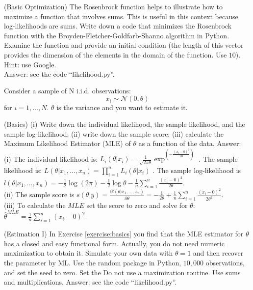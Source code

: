 \begin{exercise} (Basic Optimization)
\noindent The Rosenbrock function helps to illustrate how to maximize a function that involves sums. This is useful in this context because log-likelihoods are sums. Write down a code that minimizes the  Rosenbrock function with the Broyden-Fletcher-Goldfarb-Shanno algorithm in Python. Examine the function and provide an initial condition (the length of this vector provides the dimension of the elements in the domain of the function. Use $10$). Hint: use Google.\\
\noindent Answer: see the code ``likelihood.py''.
\end{exercise}

\noindent Consider a sample of N i.i.d. observations:
\begin{equation}
x_{i} \sim \mathcal{N}(0,\theta)
\end{equation}
\noindent for $i = 1, \ldots, N$. $\theta$ is the variance and you want to estimate it. 

\begin{exercise} (Basics) \label{exercise:basics}
(i) Write down the individual likelihood, the sample likelihood, and the sample log-likelihood; (ii) write down the sample score; (iii) calculate the Maximum Likelihood Estimator (MLE) of $\theta$ as a function of the data.
\noindent Answer:\\
\noindent (i) The individual likelihood is: $L_{i}(\theta|x_{i}) = \frac{1}{\sqrt{2\pi\theta}} \exp^{\left( -\frac{ \left( x_{i} - 0 \right)^{2}}{2 \theta} \right)}$ . The sample likelihood is: $L(\theta | x_{1}, \ldots, x_{n}) = \prod \limits _{i=1} ^{n} L_{i}(\theta|x_{i}) $ . The sample log-likelihood is $l(\theta | x_{1}, \ldots, x_{n}) = - \frac{1}{2} \log (2 \pi) - \frac{1}{2} \log \theta - \frac{1}{n} \sum \limits _{i=1} ^{n} \frac{ \left( x_{i} - 0 \right)^{2}}{2 \theta} $.\\
\noindent (ii) The sample score is $s(\theta | y) = \frac{\partial l(\theta | x_{1}, \ldots, x_{n})}{\partial \theta} = -\frac{1}{2\theta} + \frac{1}{n} \sum \limits _{i=1} ^{n} \frac{ \left( x_{i} - 0 \right)^{2}}{2 \theta^2}$. \\
\noindent (iii) To calculate the $MLE$ set the score to zero and solve for $\theta$: $\hat{\theta}^{MLE} = \frac{1}{n} \sum \limits _{i=1} ^{n} \left( x_{i} - 0 \right)^{2}$.\\

\end{exercise}

\begin{exercise} (Estimation I) \label{exercise:manual}
In Exercise \ref{exercise:basics} you find that the MLE estimator for $\theta$ has a closed and easy functional form. Actually, you do not need numeric maximization to obtain it. Simulate your own data with $\theta = 1$ and then recover the parameter by ML. Use the random package in Python, $10,000$ observations, and set the seed to zero. Set the Do not use a maximization routine. Use sums and multiplications. 
\noindent Answer: see the code ``likelihood.py''.
\end{exercise}

